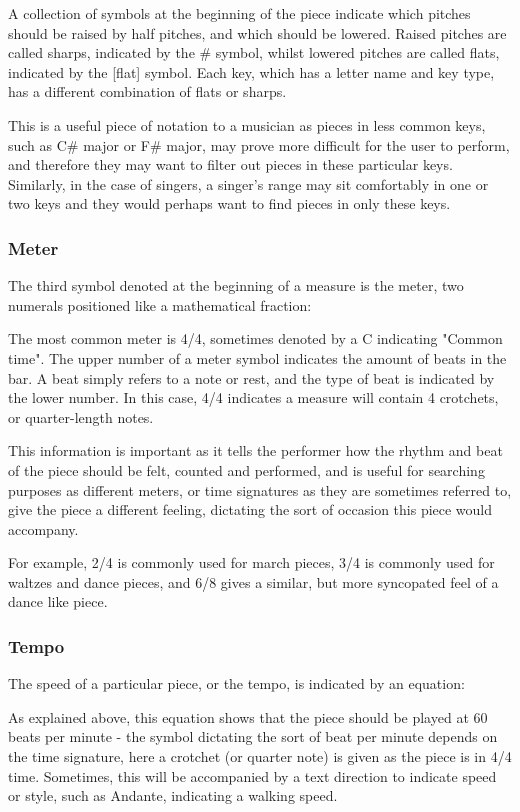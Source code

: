 \documentclass[bibtotocnumbered]{article}
\begin{document}
A collection of symbols at the beginning of the piece indicate which pitches should be raised by half pitches, and which should be lowered. Raised pitches are called sharps, indicated by the \# symbol, whilst lowered pitches are called flats, indicated by the [flat] symbol. Each key, which has a letter name and key type, has a different combination of flats or sharps.

This is a useful piece of notation to a musician as pieces in less common keys, such as C\# major or F\# major, may prove more difficult for the user to perform, and therefore they may want to filter out pieces in these particular keys. Similarly, in the case of singers, a singer's range may sit comfortably in one or two keys and they would perhaps want to find pieces in only these keys. 

\subsubsection{Meter}
The third symbol denoted at the beginning of a measure is the meter, two numerals positioned like a mathematical fraction:

The most common meter is 4/4, sometimes denoted by a C indicating "Common time". The upper number of a meter symbol indicates the amount of beats in the bar. A beat simply refers to a note or rest, and the type of beat is indicated by the lower number. In this case, 4/4 indicates a measure will contain 4 crotchets, or quarter-length notes.

This information is important as it tells the performer how the rhythm and beat of the piece should be felt, counted and performed, and is useful for searching purposes as different meters, or time signatures as they are sometimes referred to, give the piece a different feeling, dictating the sort of occasion this piece would accompany. 

For example, 2/4 is commonly used for march pieces, 3/4 is commonly used for waltzes and dance pieces, and 6/8 gives a similar, but more syncopated feel of a dance like piece.

\subsubsection{Tempo}
The speed of a particular piece, or the tempo, is indicated by an equation:

As explained above, this equation shows that the piece should be played at 60 beats per minute - the symbol dictating the sort of beat per minute depends on the time signature, here a crotchet (or quarter note) is given as the piece is in 4/4 time. Sometimes, this will be accompanied by a text direction to indicate speed or style, such as Andante, indicating a walking speed.
\end{document}
